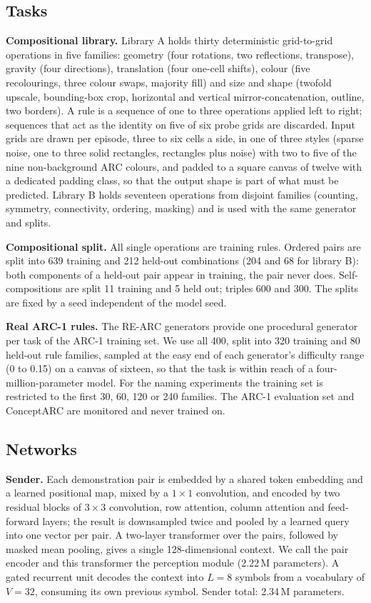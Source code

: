 \documentclass{nature}
\begin{document}
\begin{methods}
\subsection{Tasks}
\textbf{Compositional library.} Library A holds thirty deterministic grid-to-grid operations in five
families: geometry (four rotations, two reflections, transpose), gravity (four directions), translation
(four one-cell shifts), colour (five recolourings, three colour swaps, majority fill) and size and
shape (twofold upscale, bounding-box crop, horizontal and vertical mirror-concatenation, outline, two
borders). A rule is a sequence of one to three operations applied left to right; sequences that act as
the identity on five of six probe grids are discarded. Input grids are drawn per episode, three to six
cells a side, in one of three styles (sparse noise, one to three solid rectangles, rectangles plus
noise) with two to five of the nine non-background ARC colours, and padded to a square canvas of
twelve with a dedicated padding class, so that the output shape is part of what must be predicted.
Library B holds seventeen operations from disjoint families (counting, symmetry, connectivity,
ordering, masking) and is used with the same generator and splits.

\textbf{Compositional split.} All single operations are training rules. Ordered pairs are split into
639 training and 212 held-out combinations (204 and 68 for library B): both components of a held-out
pair appear in training, the pair never does. Self-compositions are split 11 training and 5 held out;
triples 600 and 300. The splits are fixed by a seed independent of the model seed.

\textbf{Real ARC-1 rules.} The RE-ARC generators \cite{hodel2024} provide one procedural generator per
task of the ARC-1 training set. We use all 400, split into 320 training and 80 held-out rule families,
sampled at the easy end of each generator's difficulty range (0 to 0.15) on a canvas of sixteen, so
that the task is within reach of a four-million-parameter model. For the naming experiments the
training set is restricted to the first 30, 60, 120 or 240 families. The ARC-1 evaluation set and
ConceptARC are monitored and never trained on.

\subsection{Networks}
\textbf{Sender.} Each demonstration pair is embedded by a shared token embedding and a learned
positional map, mixed by a $1\times1$ convolution, and encoded by two residual blocks of $3\times3$
convolution, row attention, column attention and feed-forward layers; the result is downsampled twice
and pooled by a learned query into one vector per pair. A two-layer transformer over the pairs,
followed by masked mean pooling, gives a single 128-dimensional context. We call the pair encoder and
this transformer the perception module (2.22\,M parameters). A gated recurrent unit decodes the
context into $L=8$ symbols from a vocabulary of $V=32$, consuming its own previous symbol. Sender
total: 2.34\,M parameters.


\end{methods}
\end{document}
